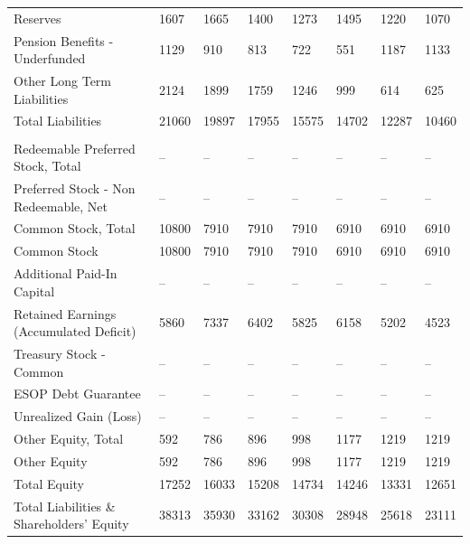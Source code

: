 \documentclass[grad,numbers]{coppe}
\begin{document}
\begin{longtable}[t]{llllllll}
  \hspace{1em}\hspace{1em}Reserves & 1607 & 1665 & 1400 & 1273 & 1495 & 1220 & 1070\\
  \hspace{1em}\hspace{1em}Pension Benefits - Underfunded & 1129 & 910 & 813 & 722 & 551 & 1187 & 1133\\
  \hspace{1em}\hspace{1em}Other Long Term Liabilities & 2124 & 1899 & 1759 & 1246 & 999 & 614 & 625\\
  \hspace{1em}Total Liabilities & 21060 & 19897 & 17955 & 15575 & 14702 & 12287 & 10460\\
  \addlinespace[0.3em]
  \multicolumn{8}{l}{\textbf{Shareholders' Equity}}\\
  \hspace{1em}Redeemable Preferred Stock, Total & -- & -- & -- & -- & -- & -- & --\\
  \hspace{1em}Preferred Stock - Non Redeemable, Net & -- & -- & -- & -- & -- & -- & --\\
  \hspace{1em}Common Stock, Total & 10800 & 7910 & 7910 & 7910 & 6910 & 6910 & 6910\\
  \hspace{1em}\hspace{1em}Common Stock & 10800 & 7910 & 7910 & 7910 & 6910 & 6910 & 6910\\
  \hspace{1em}Additional Paid-In Capital & -- & -- & -- & -- & -- & -- & --\\
  \hspace{1em}Retained Earnings (Accumulated Deficit) & 5860 & 7337 & 6402 & 5825 & 6158 & 5202 & 4523\\
  \hspace{1em}Treasury Stock - Common & -- & -- & -- & -- & -- & -- & --\\
  \hspace{1em}ESOP Debt Guarantee & -- & -- & -- & -- & -- & -- & --\\
  \hspace{1em}Unrealized Gain (Loss) & -- & -- & -- & -- & -- & -- & --\\
  \hspace{1em}Other Equity, Total & 592 & 786 & 896 & 998 & 1177 & 1219 & 1219\\
  \hspace{1em}\hspace{1em}Other Equity & 592 & 786 & 896 & 998 & 1177 & 1219 & 1219\\
  \hspace{1em}Total Equity & 17252 & 16033 & 15208 & 14734 & 14246 & 13331 & 12651\\
  \hspace{1em}Total Liabilities \& Shareholders' Equity & 38313 & 35930 & 33162 & 30308 & 28948 & 25618 & 23111\\*
  \end{longtable}
  \endgroup{}
\end{document}
